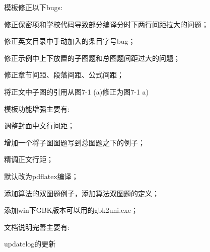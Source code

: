 模板修正以下bugs:
\begin{hitlist}
\item 修正保密项和学校代码导致部分编译分时下两行间距拉大的问题；
\item 修正英文目录中手动加入的条目字号bug；
\item 修正示例中上下放置的子图题和总图题间距过大的问题；
\item 修正章节间距、段落间距、公式间距；
\item 将正文中子图的引用从图7-1 (a)修正为图7-1 a)
\end{hitlist}

模板功能增强主要有:
\begin{hitlist}
\item 调整封面中文行间距；
\item 增加一个将子图图题写到总图题之下的例子；
\item 精调正文行距；
\item 默认改为pdflatex编译；
\item 添加算法的双图题例子，添加算法双图题的定义；
\item 添加win下GBK版本可以用的gbk2uni.exe；
\end{hitlist}

文档说明完善主要有:
\begin{hitlist}
  \item updatelog的更新
\end{hitlist}